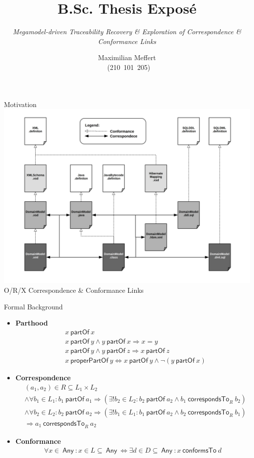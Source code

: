 \documentclass{beamer}
\title{B.Sc. Thesis Exposé}
\subtitle{\it Megamodel-driven Traceability Recovery \& Exploration of Correspondence \& Conformance Links}
\author{Maximilian Meffert\\~(210~101~205)}
\institute{University of Koblenz-Landau}
\date{}
\newcommand{\partOf}{~\textsf{partOf}~}
\newcommand{\properPartOf}{~\textsf{properPartOf}~}
\newcommand{\Any}{~\textsf{Any}~}
\newcommand{\correspondsToR}[1]{~\textsf{correspondsTo}_{#1}~}
\newcommand{\conformsTo}{~\textsf{conformsTo}~}
\begin{document}
\frame{\titlepage}

\begin{frame}{Motivation}
\centering
\includegraphics[width=.9\textwidth]{orx-correspondence-big-picture.png}
\newline
O/R/X Correspondence \& Conformance Links
\end{frame}

\begin{frame}{Formal Background}
\begin{itemize}
\item
\textbf{Parthood}\cite{DBLP:conf/sle/Lammel16}\cite{DBLP:journals/dke/Varzi96}
{\scriptsize
\begin{align*}
&x \partOf x
\\&x \partOf y \wedge y \partOf x \Rightarrow x = y
\\&x \partOf y \wedge y \partOf z \Rightarrow x \partOf z
\\&x \properPartOf y \Leftrightarrow x \partOf y \wedge \neg(y \partOf x)
\end{align*}
}
\item
\textbf{Correspondence}\cite{DBLP:conf/sle/Lammel16}
{\scriptsize
\begin{align*}
&(a_1,a_2) \in R \subseteq L_1 \times L_2
\\&\wedge \forall b_1 \in L_1 : b_1 \partOf a_1 \Rightarrow (\exists! b_2 \in L_2 : b_2 \partOf a_2 \wedge b_1 \correspondsToR{R} b_2 )
\\&\wedge \forall b_2 \in L_2 : b_2 \partOf a_2 \Rightarrow (\exists! b_1 \in L_1 : b_1 \partOf a_2 \wedge b_2 \correspondsToR{R} b_1 )
\\&\Rightarrow a_1 \correspondsToR{R} a_2
\end{align*}
}
\item
\textbf{Conformance}\cite{DBLP:conf/sle/Lammel16}
{\scriptsize
\begin{align*}
\forall x \in \Any :
x \in L \subseteq \Any \Leftrightarrow \exists d \in D \subseteq \Any : x \conformsTo d
\end{align*}
}

\end{itemize}
\end{frame}
\end{document}
